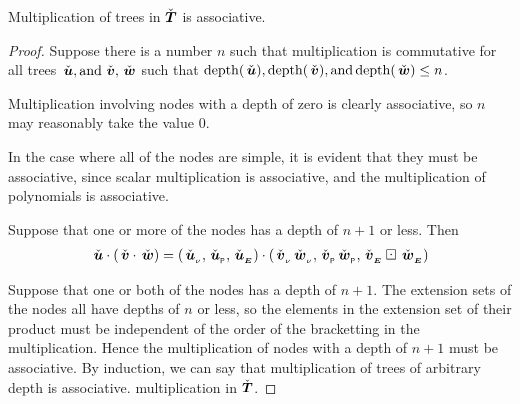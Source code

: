 \begin{proposition}\label{TMassociativity}
Multiplication of trees in $\check{\boldsymbol{T}}$ is associative.
\begin{proof}
  Suppose there is a number $n$ such that multiplication is
  commutative for all trees $\,\check{\boldsymbol{u}}, \operatorname{\text{and}} \,\check{\boldsymbol{v}}, \,\check{\boldsymbol{w}}$ such that
  $\operatorname{depth}(\,\check{\boldsymbol{u}}), \operatorname{depth}(\,\check{\boldsymbol{v}}), \operatorname{\text{and}}  \operatorname{depth}(\,\check{\boldsymbol{w}}) \le n$.


  Multiplication involving nodes with a depth of zero is clearly associative, so
  $n$ may reasonably take the value 0.

  In the case where all of the nodes are simple, it is evident that
  they must be associative, since scalar multiplication is associative, and the
  multiplication of \polyrat polynomials is associative.

  Suppose that one or more of the nodes has a depth of $n+1$ or
  less. Then
  \begin{align*}
    \,\check{\boldsymbol{u}} \cdot (\,\check{\boldsymbol{v}} \cdot \,\check{\boldsymbol{w}}) &=
    ({\,\check{\boldsymbol{u}}}{{}_{_{\nu}}},{\,\check{\boldsymbol{u}}}{{}_{_{\mathsf{P}}}},{\,\check{\boldsymbol{u}}}{{}_{_{\boldsymbol{E}}}}) \cdot ({\,\check{\boldsymbol{v}}}{{}_{_{\nu}}} {\,\check{\boldsymbol{w}}}{{}_{_{\nu}}},{\,\check{\boldsymbol{v}}}{{}_{_{\mathsf{P}}}} {\,\check{\boldsymbol{w}}}{{}_{_{\mathsf{P}}}},{\,\check{\boldsymbol{v}}}{{}_{_{\boldsymbol{E}}}}\boxdot{\,\check{\boldsymbol{w}}}{{}_{_{\boldsymbol{E}}}})\\
  \end{align*}





  Suppose that one or both of the nodes has a depth of $n+1$. The
  extension sets of the nodes all have depths of $n$ or less, so the
  elements in the extension set of their product must be independent of the order of the
  bracketting in the multiplication.  Hence the multiplication of
  nodes with a depth of $n+1$ must be associative.  By induction, we can say
  that multiplication of trees of arbitrary depth is associative.
  multiplication in $\check{\boldsymbol{T}}$.
\end{proof}
\end{proposition}

